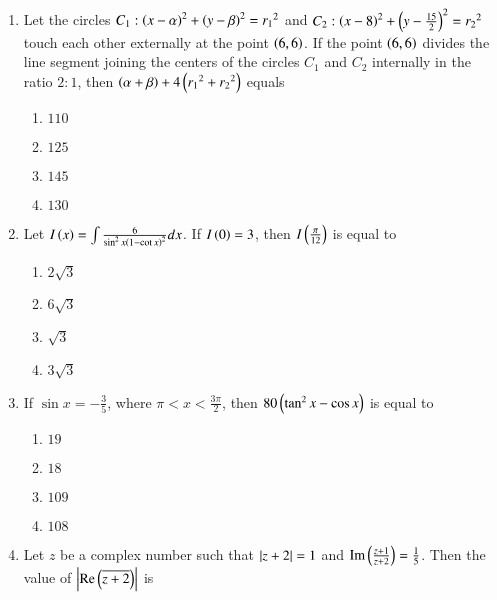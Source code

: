 \documentclass[journal,12pt,onecolumn]{IEEEtran}
\theoremstyle{remark}
\begin{document}
\begin{enumerate}[start=1]
\begin{enumerate}
		\end{enumerate}
	\item Let the circles $C_1:{\left(x-\alpha\right)}^2+{\left(y-\beta\right)}^2={r_1}^2$ and $C_2:{\left(x-8\right)}^2+{\left(y-\frac{15}{2}\right)}^2={r_2}^2$ touch each other externally at the point $\left(6,6\right)$. If the point $\left(6,6\right)$ divides the line segment joining the centers of the circles $C_1$ and $C_2$ internally in the ratio $2:1$, then $\left(\alpha+\beta\right)+4\left({r_1}^2+{r_2}^2\right)$ equals 
		\begin{enumerate}
			\item $110$\\
			\item $125$\\
			\item $145$\\
			\item $130$\\
		\end{enumerate}
	\item Let $I\left(x\right)=\int\frac{6}{\sin^2{x}{\left(1-\cot{x}\right)}^2}dx$. If $I\left(0\right)=3$, then $I\left(\frac{\pi}{12}\right)$ is equal to 
		\begin{enumerate}
			\item $2\sqrt{3}$\\
			\item $6\sqrt{3}$\\
			\item $\sqrt{3}$\\
			\item $3\sqrt{3}$\\
		\end{enumerate}
	\item If $\sin{x}=-\frac{3}{5}$, where $\pi<x<\frac{3\pi}{2}$, then $80\left(\tan^2{x}-\cos{x}\right)$ is equal to 
		\begin{enumerate}
			\item $19$\\
			\item $18$\\
			\item $109$\\
			\item $108$\\
		\end{enumerate}
	\item Let $z$ be a complex number such that $\left\vert z+2\right\vert=1$ and $\operatorname{Im}\left(\frac{z+1}{z+2}\right)=\frac{1}{5}$. Then the value of $\left\vert\operatorname{Re}\left(\overline{z+2}\right)\right\vert$ is
		\begin{enumerate}

\end{enumerate}
\end{enumerate}
\end{document}
